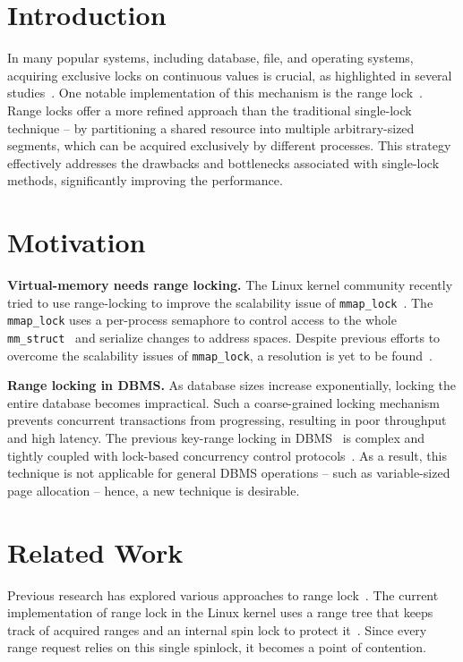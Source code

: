 \section{Introduction}
In many popular systems, including database, file, and operating systems, acquiring exclusive locks on continuous values is crucial, as highlighted in several studies~\parencite{lomet1993key, readerWriterLocks2017, graefe2007hierarchical, lee2021concurrent, gao2023citron, lee2019write}. One notable implementation of this mechanism is the range lock~\parencite{gao2023citron, kogan2020scalable}.
Range locks offer a more refined approach than the traditional single-lock technique -- by partitioning a shared resource into multiple arbitrary-sized segments, which can be acquired exclusively by different processes.
This strategy effectively addresses the drawbacks and bottlenecks associated with single-lock methods, significantly improving the performance.

\section{Motivation}

\textbf{Virtual-memory needs range locking.}
The Linux kernel community recently tried to use range-locking to improve the scalability issue of \texttt{mmap\_lock}~\parencite{readerWriterLocks2017, mapleTree2021, mmapLock2022}. The \texttt{mmap\_lock} uses a per-process semaphore to control access to the whole \texttt{mm\_struct}~\parencite{mmstruct2023} and serialize changes to address spaces. Despite previous efforts to overcome the scalability issues of \texttt{mmap\_lock}, a resolution is yet to be found~\parencite{mmapLock2022}.

\textbf{Range locking in DBMS.}
As database sizes increase exponentially, locking the entire database becomes impractical.
Such a coarse-grained locking mechanism prevents concurrent transactions from progressing, resulting in poor throughput and high latency.
The previous key-range locking in DBMS~\parencite{graefe2007hierarchical, andy2022database} is complex and tightly coupled with lock-based concurrency control protocols~\parencite{andy2022database}.
As a result, this technique is not applicable for general DBMS operations -- such as variable-sized page allocation -- hence, a new technique is desirable.

\section{Related Work}
Previous research has explored various approaches to range lock~\parencite{linuxRangeLockImpl2013, song2013parallelizing, kogan2020scalable}. The current implementation of range lock in the Linux kernel uses a range tree that keeps track of acquired ranges and an internal spin lock to protect it~\parencite{linuxRangeLockImpl2013}. Since every range request relies on this single spinlock, it becomes a point of contention. 

